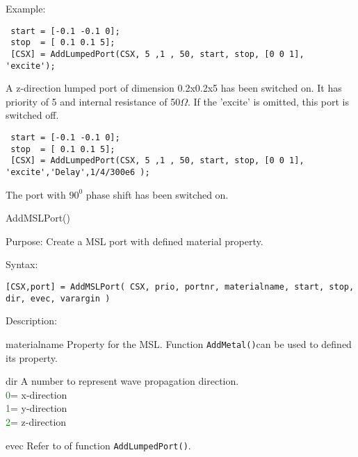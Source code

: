 \begin{FontDescr}{Example:}

\begin{lstlisting} 
 start = [-0.1 -0.1 0];
 stop  = [ 0.1 0.1 5];
 [CSX] = AddLumpedPort(CSX, 5 ,1 , 50, start, stop, [0 0 1], 'excite');
\end{lstlisting}
A z-direction lumped port of dimension 0.2x0.2x5 has been switched on. It has priority of 5 and internal resistance of 50$\Omega$. If the 'excite' is omitted, this port is switched off. 
   
\begin{lstlisting} 
 start = [-0.1 -0.1 0];
 stop  = [ 0.1 0.1 5];
 [CSX] = AddLumpedPort(CSX, 5 ,1 , 50, start, stop, [0 0 1], 'excite','Delay',1/4/300e6 );
\end{lstlisting}
The port with $90^{0}$ phase shift has been switched on. 
\end{FontDescr}


\begin{FontNameFunct}{AddMSLPort()}
\end{FontNameFunct}

\begin{FontDescr}{Purpose:}
Create a MSL port with defined material property. 
\end{FontDescr}

\begin{FontDescr}{Syntax:}
  \begin{lstlisting}
[CSX,port] = AddMSLPort( CSX, prio, portnr, materialname, start, stop, dir, evec, varargin )
  \end{lstlisting}
\end{FontDescr}

\begin{FontDescr}{Description:}
\begin{FontPara}{materialname}
Property for the MSL. Function \texttt{AddMetal()}can be used to defined its property. 
\end{FontPara}

\begin{FontPara}{dir}
A number to represent wave propagation direction.\\
\textcolor{green}{0}= x-direction\\
\textcolor{green}{1}= y-direction\\
\textcolor{green}{2}= z-direction\\
\end{FontPara}

\begin{FontPara}{evec}
Refer to \hyperref[Edir]{} of function \texttt{AddLumpedPort()}. 
\end{FontPara}
\end{FontDescr}

